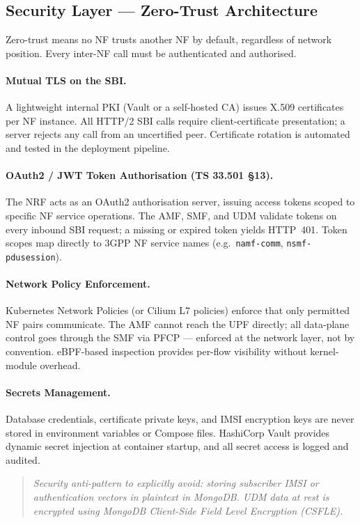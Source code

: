 \documentclass[11pt,a4paper]{report}
\newcommand{\code}[1]{\texttt{\small #1}}
\begin{document}
\subsection{Security Layer --- Zero-Trust Architecture}
Zero-trust means no NF trusts another NF by default, regardless of network position.
Every inter-NF call must be authenticated and authorised.

\paragraph{Mutual TLS on the SBI.}
A lightweight internal PKI (Vault or a self-hosted CA) issues X.509 certificates per NF
instance. All HTTP/2 SBI calls require client-certificate presentation; a server rejects
any call from an uncertified peer. Certificate rotation is automated and tested in the
deployment pipeline.

\paragraph{OAuth2 / JWT Token Authorisation (TS 33.501 §13).}
The NRF acts as an OAuth2 authorisation server, issuing access tokens scoped to specific
NF service operations. The AMF, SMF, and UDM validate tokens on every inbound SBI
request; a missing or expired token yields HTTP~401. Token scopes map directly to 3GPP
NF service names (e.g.\ \code{namf-comm}, \code{nsmf-pdusession}).

\paragraph{Network Policy Enforcement.}
Kubernetes Network Policies (or Cilium L7 policies) enforce that only permitted NF pairs
communicate. The AMF cannot reach the UPF directly; all data-plane control goes through
the SMF via PFCP --- enforced at the network layer, not by convention. eBPF-based
inspection provides per-flow visibility without kernel-module overhead.

\paragraph{Secrets Management.}
Database credentials, certificate private keys, and IMSI encryption keys are never stored
in environment variables or Compose files. HashiCorp Vault provides dynamic secret
injection at container startup, and all secret access is logged and audited.

\begin{quote}\itshape
Security anti-pattern to explicitly avoid: storing subscriber IMSI or authentication
vectors in plaintext in MongoDB. UDM data at rest is encrypted using MongoDB Client-Side
Field Level Encryption (CSFLE).
\end{quote}
\end{document}
